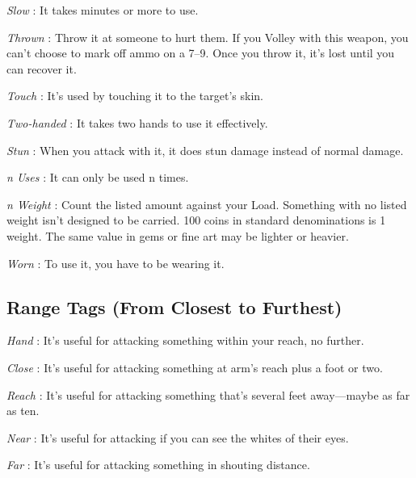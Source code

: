  

{\em Slow} : It takes minutes or more to use.

 

{\em Thrown} : Throw it at someone to hurt them. If you Volley with this weapon, you can't choose to mark off ammo on a 7–9. Once you throw it, it's lost until you can recover it. 

 

{\em Touch} : It's used by touching it to the target's skin.

 

{\em Two-handed} : It takes two hands to use it effectively.

 

{\em Stun} : When you attack with it, it does stun damage instead of normal damage. 

 

{\em n Uses} : It can only be used n times. 

 

{\em n Weight} : Count the listed amount against your Load. Something with no listed weight isn't designed to be carried. 100 coins in standard denominations is 1 weight. The same value in gems or fine art may be lighter or heavier.

 

{\em Worn} : To use it, you have to be wearing it.

 
\subsection{Range Tags (From Closest to Furthest)}       
 

{\em Hand} : It's useful for attacking something within your reach, no further.

 

{\em Close} : It's useful for attacking something at arm's reach plus a foot or two.

 

{\em Reach} : It's useful for attacking something that's several feet away—maybe as far as ten. 

 

{\em Near} : It's useful for attacking if you can see the whites of their eyes. 

 

{\em Far} : It's useful for attacking something in shouting distance.

